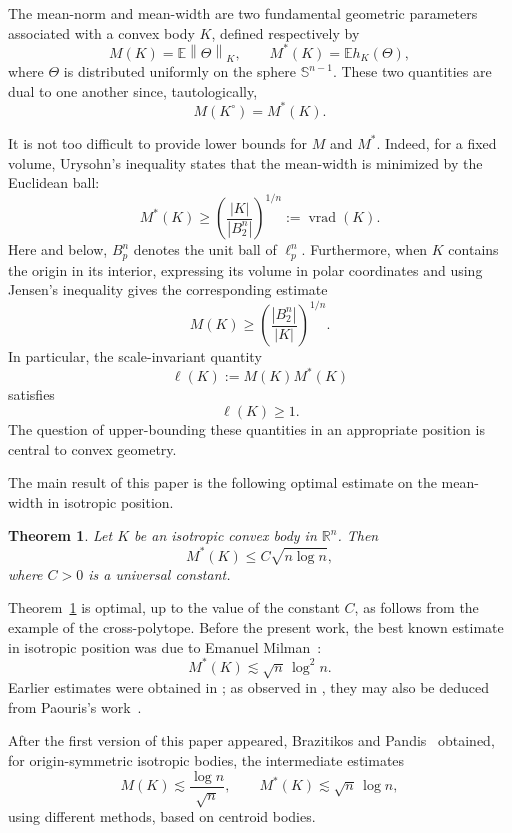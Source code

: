 \documentclass[12pt]{article}
\newtheorem{theorem}{Theorem}[section]
\theoremstyle{definition}
\theoremstyle{remark}
\newcommand{\R}{\mathbb R}
\newcommand{\E}{\mathbb E}
\newcommand{\norm}[1]{\left\lVert #1\right\rVert}
\begin{document}
The mean-norm and mean-width are two fundamental geometric parameters
associated with a convex body $K$, defined respectively by
\[
  M(K)=\E\norm{\Theta}_K,
  \qquad
  M^*(K)=\E h_K(\Theta),
\]
where $\Theta$ is distributed uniformly on the sphere
$\mathbb S^{n-1}$. These two quantities are dual to one another since,
tautologically,
\[
  M(K^\circ)=M^*(K).
\]

It is not too difficult to provide lower bounds for $M$ and $M^*$.
Indeed, for a fixed volume, Urysohn's inequality states that the
mean-width is minimized by the Euclidean ball:
\begin{equation}\label{eq_157}
  M^*(K)
  \geq
  \left(\frac{|K|}{|B_2^n|}\right)^{1/n} := \operatorname{vrad}(K).
\end{equation}
Here and below, $B_p^n$ denotes the unit ball of $\ell_p^n$.
Furthermore, when $K$ contains the origin in its interior, expressing
its volume in polar coordinates and using Jensen's inequality gives
the corresponding estimate
\begin{equation}\label{eq_166}
  M(K)
  \geq
  \left(\frac{|B_2^n|}{|K|}\right)^{1/n}.
\end{equation}
In particular, the scale-invariant quantity
\[
  \ell(K):=M(K)M^*(K)
\]
satisfies
\[
  \ell(K)\geq1.
\]
The
question of upper-bounding these quantities in an appropriate position
is central to convex geometry.

The main result of this paper is the following optimal estimate on the
mean-width in isotropic position.

\begin{theorem}\label{thm_186}
Let $K$ be an isotropic convex body in $\R^n$. Then
\begin{equation}\label{eq_188}
  M^*(K)\leq C\sqrt{n\log n},
\end{equation}
where $C>0$ is a universal constant.
\end{theorem}

Theorem~\ref{thm_186} is optimal, up to the value of the
constant $C$, as follows from the example of the cross-polytope. Before
the present work, the best known estimate in isotropic position was due
to Emanuel Milman~\cite{Milman}:
\[
  M^*(K)\lesssim\sqrt n\,\log^2 n.
\]
Earlier estimates were obtained in
\cite{HartzoulakiThesis,PivovarovMeanWidth}; as observed in
\cite{BrazitikosGiannopoulosValettasVritsiou}, they may also be deduced
from Paouris's work~\cite{PaourisConcentration}.

After the first version of this paper appeared, Brazitikos and Pandis~\cite{BrazitikosPandis} obtained,
for origin-symmetric isotropic bodies, the intermediate estimates
\[
  M(K)\lesssim\frac{\log n}{\sqrt n},
  \qquad
  M^*(K)\lesssim\sqrt n\,\log n,
\]
using different methods, based on centroid bodies.
\end{document}

